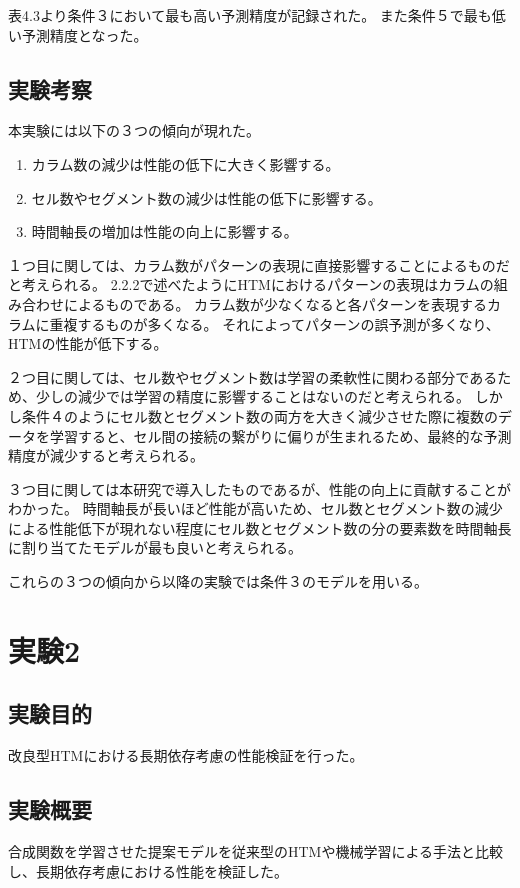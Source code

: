 表4.3より条件３において最も高い予測精度が記録された。
また条件５で最も低い予測精度となった。

\newpage
\subsection{実験考察}
本実験には以下の３つの傾向が現れた。

\begin{enumerate}
  \item カラム数の減少は性能の低下に大きく影響する。
  \item セル数やセグメント数の減少は性能の低下に影響する。
  \item 時間軸長の増加は性能の向上に影響する。
\end{enumerate}

１つ目に関しては、カラム数がパターンの表現に直接影響することによるものだと考えられる。
2.2.2で述べたようにHTMにおけるパターンの表現はカラムの組み合わせによるものである。
カラム数が少なくなると各パターンを表現するカラムに重複するものが多くなる。
それによってパターンの誤予測が多くなり、HTMの性能が低下する。

２つ目に関しては、セル数やセグメント数は学習の柔軟性に関わる部分であるため、少しの減少では学習の精度に影響することはないのだと考えられる。
しかし条件４のようにセル数とセグメント数の両方を大きく減少させた際に複数のデータを学習すると、セル間の接続の繋がりに偏りが生まれるため、最終的な予測精度が減少すると考えられる。

３つ目に関しては本研究で導入したものであるが、性能の向上に貢献することがわかった。
時間軸長が長いほど性能が高いため、セル数とセグメント数の減少による性能低下が現れない程度にセル数とセグメント数の分の要素数を時間軸長に割り当てたモデルが最も良いと考えられる。

これらの３つの傾向から以降の実験では条件３のモデルを用いる。

\section{実験2}
\subsection{実験目的}
改良型HTMにおける長期依存考慮の性能検証を行った。

\subsection{実験概要}
合成関数を学習させた提案モデルを従来型のHTMや機械学習による手法と比較し、長期依存考慮における性能を検証した。

